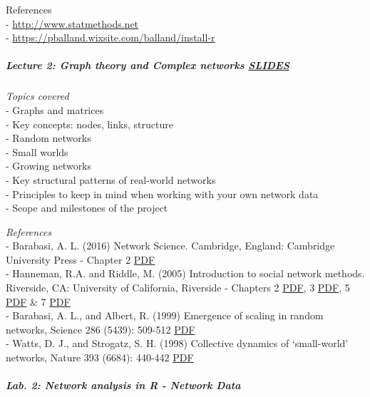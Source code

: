 \documentclass[
]{article}
\begin{document}
References\\
- \url{http://www.statmethods.net}\\
- \url{https://pballand.wixsite.com/balland/install-r}

\hypertarget{lecture-2-graph-theory-and-complex-networks-slides}{%
\subparagraph{\texorpdfstring{\textbf{Lecture 2: Graph theory and
Complex networks}
\href{https://github.com/PABalland/PABalland.github.io/raw/master/teaching/on/L2.pdf}{SLIDES}}{Lecture 2: Graph theory and Complex networks SLIDES}}\label{lecture-2-graph-theory-and-complex-networks-slides}}

\emph{Topics covered}\\
- Graphs and matrices\\
- Key concepts: nodes, links, structure\\
- Random networks\\
- Small worlds\\
- Growing networks\\
- Key structural patterns of real-world networks\\
- Principles to keep in mind when working with your own network data\\
- Scope and milestones of the project

\emph{References}\\
- Barabasi, A. L. (2016) Network Science. Cambridge, England: Cambridge
University Press - Chapter 2
\href{http://networksciencebook.com/chapter/2}{PDF}\\
- Hanneman, R.A. and Riddle, M. (2005) Introduction to social network
methods. Riverside, CA: University of California, Riverside - Chapters 2
\href{http://faculty.ucr.edu/~hanneman/nettext/C2_Formal_Methods.html}{PDF},
3 \href{http://faculty.ucr.edu/~hanneman/nettext/C3_Graphs.html}{PDF}, 5
\href{http://faculty.ucr.edu/~hanneman/nettext/C5_\%20Matrices.html}{PDF}
\& 7
\href{http://faculty.ucr.edu/~hanneman/nettext/C7_Connection.html}{PDF}\\
- Barabasi, A. L., and Albert, R. (1999) Emergence of scaling in random
networks, Science 286 (5439): 509-512
\href{https://2c2e773f-85c0-4039-818c-ea517fc75085.filesusr.com/ugd/c5611b_0f8a62d4615e4821859c249a3a0802af.pdf}{PDF}\\
- Watts, D. J., and Strogatz, S. H. (1998) Collective dynamics of
`small-world' networks, Nature 393 (6684): 440-442
\href{https://2c2e773f-85c0-4039-818c-ea517fc75085.filesusr.com/ugd/c5611b_a47348d589f943d38faf71c2c1769b79.pdf}{PDF}

\hypertarget{lab.-2-network-analysis-in-r---network-data}{%
\subparagraph{\texorpdfstring{\textbf{Lab. 2: Network analysis in R -
Network
Data}}{Lab. 2: Network analysis in R - Network Data}}\label{lab.-2-network-analysis-in-r---network-data}}
\end{document}
